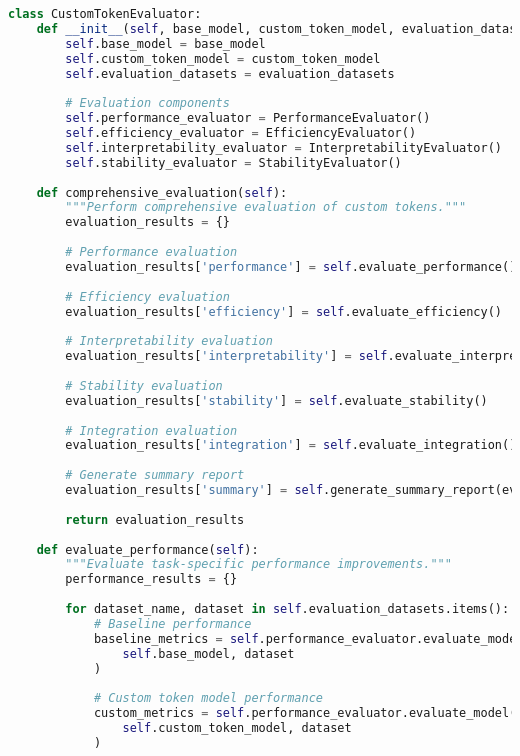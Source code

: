 \begin{lstlisting}[language=Python, caption=Comprehensive evaluation framework for custom tokens]
class CustomTokenEvaluator:
    def __init__(self, base_model, custom_token_model, evaluation_datasets):
        self.base_model = base_model
        self.custom_token_model = custom_token_model
        self.evaluation_datasets = evaluation_datasets
        
        # Evaluation components
        self.performance_evaluator = PerformanceEvaluator()
        self.efficiency_evaluator = EfficiencyEvaluator()
        self.interpretability_evaluator = InterpretabilityEvaluator()
        self.stability_evaluator = StabilityEvaluator()
    
    def comprehensive_evaluation(self):
        """Perform comprehensive evaluation of custom tokens."""
        evaluation_results = {}
        
        # Performance evaluation
        evaluation_results['performance'] = self.evaluate_performance()
        
        # Efficiency evaluation
        evaluation_results['efficiency'] = self.evaluate_efficiency()
        
        # Interpretability evaluation
        evaluation_results['interpretability'] = self.evaluate_interpretability()
        
        # Stability evaluation
        evaluation_results['stability'] = self.evaluate_stability()
        
        # Integration evaluation
        evaluation_results['integration'] = self.evaluate_integration()
        
        # Generate summary report
        evaluation_results['summary'] = self.generate_summary_report(evaluation_results)
        
        return evaluation_results
    
    def evaluate_performance(self):
        """Evaluate task-specific performance improvements."""
        performance_results = {}
        
        for dataset_name, dataset in self.evaluation_datasets.items():
            # Baseline performance
            baseline_metrics = self.performance_evaluator.evaluate_model(
                self.base_model, dataset
            )
            
            # Custom token model performance
            custom_metrics = self.performance_evaluator.evaluate_model(
                self.custom_token_model, dataset
            )
            

\end{lstlisting}
